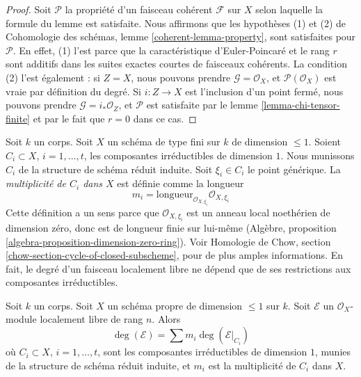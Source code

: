 \begin{proof}
Soit $\mathcal{P}$ la propriété d'un faisceau cohérent $\mathcal{F}$
sur $X$ selon laquelle la formule du lemme est satisfaite. Nous affirmons que
les hypothèses (1) et (2) de
Cohomologie des schémas, lemme \ref{coherent-lemma-property},
sont satisfaites pour $\mathcal{P}$. En effet, (1) l'est parce que la caractéristique d'Euler-Poincaré
et le rang $r$ sont additifs dans les suites exactes courtes de faisceaux cohérents.
La condition (2) l'est également : si $Z = X$, nous pouvons prendre
$\mathcal{G} = \mathcal{O}_X$, et $\mathcal{P}(\mathcal{O}_X)$
est vraie par définition du degré. Si $i : Z \to X$ est l'inclusion
d'un point fermé, nous pouvons prendre $\mathcal{G} = i_*\mathcal{O}_Z$,
et $\mathcal{P}$ est satisfaite par le lemme \ref{lemma-chi-tensor-finite}
et par le fait que $r = 0$ dans ce cas.
\end{proof}

\noindent
Soit $k$ un corps. Soit $X$ un schéma de type fini sur $k$ de
dimension $\leq 1$. Soient $C_i \subset X$, $i = 1, \ldots, t$, les
composantes irréductibles de dimension $1$. Nous munissons $C_i$ de la
structure de schéma réduit induite. Soit $\xi_i \in C_i$ le
point générique. La {\it multiplicité de $C_i$ dans $X$} est définie
comme la longueur
$$
m_i = \text{longueur}_{\mathcal{O}_{X, \xi_i}} \mathcal{O}_{X, \xi_i}
$$
Cette définition a un sens parce que $\mathcal{O}_{X, \xi_i}$ est un anneau local
noethérien de dimension zéro, donc est de longueur finie sur lui-même
(Algèbre, proposition \ref{algebra-proposition-dimension-zero-ring}).
Voir Homologie de Chow, section \ref{chow-section-cycle-of-closed-subscheme},
pour de plus amples informations. En fait, le degré d'un faisceau localement libre
ne dépend que de ses restrictions aux composantes irréductibles.

\begin{lemma}
\label{lemma-degree-in-terms-of-components}
Soit $k$ un corps. Soit $X$ un schéma propre de dimension $\leq 1$ sur $k$.
Soit $\mathcal{E}$ un $\mathcal{O}_X$-module localement libre de rang $n$.
Alors
$$
\deg(\mathcal{E}) = \sum m_i \deg(\mathcal{E}|_{C_i})
$$
où $C_i \subset X$, $i = 1, \ldots, t$, sont les composantes irréductibles
de dimension $1$, munies de la structure de schéma réduit induite, et $m_i$ est la
multiplicité de $C_i$ dans $X$.
\end{lemma}

